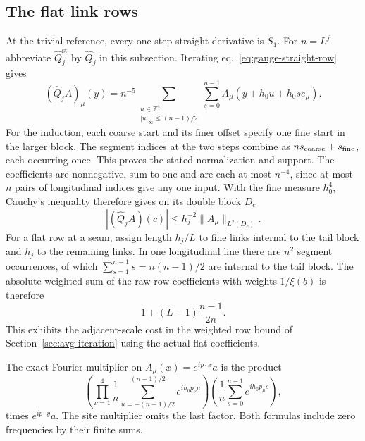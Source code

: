\documentclass[11pt,letterpaper,reqno]{amsart}
\numberwithin{equation}{section}
\renewcommand{\eqref}[1]{\textup{eq.~\ref{#1}}}
\theoremstyle{definition}
\theoremstyle{remark}
\begin{document}
\subsection{The flat link rows}

At the trivial reference, every one-step straight derivative is
\(S_1\). For \(n=L^j\) abbreviate
\(\widehat Q_j^{\mathrm{st}}\) by \(\widehat Q_j\) in this
subsection. Iterating \eqref{eq:gauge-straight-row} gives
\begin{equation}\label{eq:gauge-flat-row}
 (\widehat Q_j A)_\mu(y)= n^{-5}\!
    \sum_{\substack{u\in\mathbb Z^4\\|u|_\infty\le(n-1)/2}}
       \sum_{s=0}^{n-1} A_\mu(y+h_0u+h_0s e_\mu).
\end{equation}
For the induction, each coarse start and its finer offset specify
one fine start in the larger block. The segment indices at the two
steps combine as \(n s_{\rm coarse}+s_{\rm fine}\), each occurring
once. This proves the stated normalization and support.
The coefficients are nonnegative, sum to one and are each at most
\(n^{-4}\), since at most \(n\) pairs of longitudinal indices give
any one input. With the fine measure \(h_0^4\), Cauchy's inequality
therefore gives on its double block \(D_c\)
\begin{equation}\label{eq:gauge-flat-row-L2}
 |(\widehat Q_jA)(c)|\le h_j^{-2}\|A_\mu\|_{L^2(D_c)}.
\end{equation}
For a flat row at a seam, assign length \(h_j/L\) to fine links
internal to the tail block and \(h_j\) to the remaining links.
In one longitudinal line there are \(n^2\) segment occurrences,
of which \(\sum_{s=1}^{n-1}s=n(n-1)/2\) are internal to the
tail block. The absolute weighted sum of the raw row coefficients
with weights \(1/\xi(b)\) is therefore
\[
 1+(L-1)\frac{n-1}{2n}.
\]
This exhibits the adjacent-scale cost in the weighted row bound of
Section~\ref{sec:avg-iteration} using the actual flat coefficients.

The exact Fourier multiplier on \(A_\mu(x)=e^{i p\cdot x}a\) is
the product
\[
 \left(\prod_{\nu=1}^4\frac1n\sum_{u=-(n-1)/2}^{(n-1)/2}
                         e^{ih_0p_\nu u}\right)
 \left(\frac1n\sum_{s=0}^{n-1}e^{ih_0p_\mu s}\right),
\]
times \(e^{ip\cdot y}a\). The site multiplier omits the last
factor. Both formulas include zero frequencies by their finite
sums.
\end{document}
